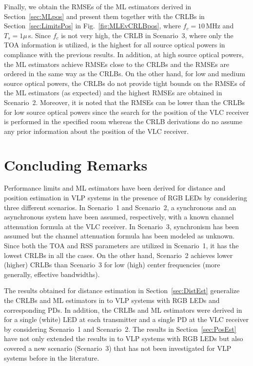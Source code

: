 \documentclass[10pt,twocolumn]{IEEEtran}
\begin{document}
Finally, we obtain the RMSEs of the ML estimators derived in Section~\ref{sec:MLpos} and present them together with the CRLBs in Section~\ref{sec:LimitsPos} in Fig.~\ref{fig:MLEvCRLBpos}, where $f_c=10\,$MHz and $T_s=1 \mu\,$s. Since $f_c$ is not very high, the CRLB in Scenario~3, where only the TOA information is utilized, is the highest for all source optical powers in compliance with the previous results. In addition, at high source optical powers, the ML estimators achieve RMSEs close to the CRLBs and the RMSEs are ordered in the same way as the CRLBs. On the other hand, for low and medium source optical powers, the CRLBs do not provide tight bounds on the RMSEs of the ML estimators (as expected) and the highest RMSEs are obtained in Scenario~2. Moreover, it is noted that the RMSEs can be lower than the CRLBs for low source optical powers since the search for the position of the VLC receiver is performed in the specified room whereas the CRLB derivations do no assume any prior information about the position of the VLC receiver.


\section{Concluding Remarks}\label{sec:Conc}

Performance limits and ML estimators have been derived for distance and position estimation in VLP systems in the presence of RGB LEDs by considering three different scenarios. In Scenario~1 and Scenario~2, a synchronous and an asynchronous system have been assumed, respectively, with a known channel attenuation formula at the VLC receiver. In Scenario~3, synchronism has been assumed but the channel attenuation formula has been modeled as unknown. Since both the TOA and RSS parameters are utilized in Scenario~1, it has the lowest CRLBs in all the cases. On the other hand, Scenario~2 achieves lower (higher) CRLBs than Scenario~3 for low (high) center frequencies (more generally, effective bandwidths).

The results obtained for distance estimation in Section~\ref{sec:DistEst} generalize the CRLBs and ML estimators in \cite{MFK_CRLB} to VLP systems with RGB LEDs and corresponding PDs. In addition, the CRLBs and ML estimators were derived in \cite{Direct_TCOM} for a single (white) LED at each transmitter and a single PD at the VLC receiver by considering Scenario~1 and Scenario~2. The results in Section~\ref{sec:PosEst} have not only extended the results in \cite{Direct_TCOM} to VLP systems with RGB LEDs but also covered a new scenario (Scenario~3) that has not been investigated for VLP systems before in the literature.
\end{document}
